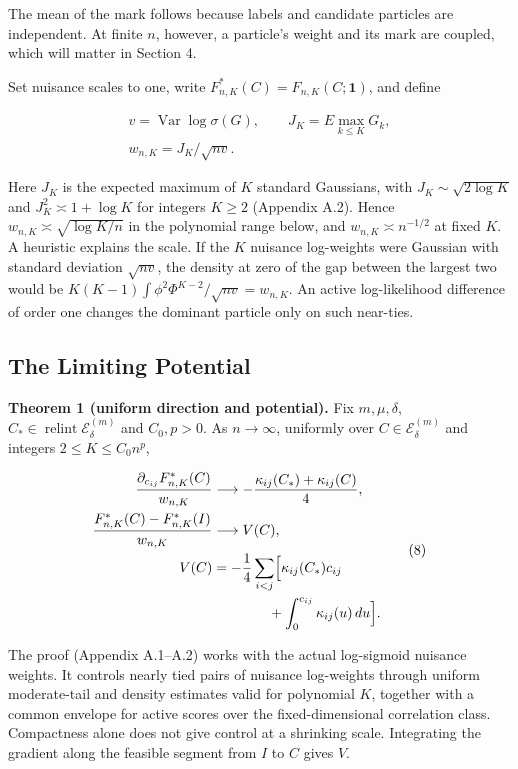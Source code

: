 \documentclass{article}
\begin{document}
The mean of the mark follows because labels and candidate particles are
independent. At finite \(n\), however, a particle's weight and its mark
are coupled, which will matter in Section 4.

Set nuisance scales to one, write \(F_{n,K}^*(C)=F_{n,K}(C;\mathbf1)\),
and define

\[
\begin{gathered}
v=\operatorname{Var}\log\sigma(G),\qquad J_K=E\max_{k\le K}G_k,\\
w_{n,K}=J_K/\sqrt{nv}.
\end{gathered}
\tag{7}
\]

Here \(J_K\) is the expected maximum of \(K\) standard Gaussians, with
\(J_K\sim\sqrt{2\log K}\) and \(J_K^2\asymp1+\log K\) for integers
\(K\ge2\) (Appendix A.2). Hence \(w_{n,K}\asymp\sqrt{\log K/n}\) in the
polynomial range below, and \(w_{n,K}\asymp n^{-1/2}\) at fixed \(K\). A
heuristic explains the scale. If the \(K\) nuisance log-weights were
Gaussian with standard deviation \(\sqrt{nv}\), the density at zero of
the gap between the largest two would be
\(K(K-1)\int\phi^2\Phi^{K-2}/\sqrt{nv}=w_{n,K}\). An active
log-likelihood difference of order one changes the dominant particle
only on such near-ties.

\subsection{The Limiting Potential}\label{the-limiting-potential}

\textbf{Theorem 1 (uniform direction and potential).} Fix
\(m,\mu,\delta\), \(C_*\in\operatorname{relint}\mathcal E_\delta^{(m)}\)
and \(C_0,p>0\). As \(n\to\infty\), uniformly over
\(C\in\mathcal E_\delta^{(m)}\) and integers \(2\le K\le C_0n^p\),

\[
\begin{aligned}
\frac{\partial_{c_{ij}}F_{n,K}^*(C)}{w_{n,K}}
&\longrightarrow-\frac{\kappa_{ij}(C_*)+\kappa_{ij}(C)}4,\\
\frac{F_{n,K}^*(C)-F_{n,K}^*(I)}{w_{n,K}}
&\longrightarrow V(C),\\
V(C)&=-\frac14\sum_{i<j}\Bigl[\kappa_{ij}(C_*)c_{ij}\\
&\qquad\qquad+\int_0^{c_{ij}}\kappa_{ij}(u)\,du\Bigr].
\end{aligned}
\tag{8}
\]

The proof (Appendix A.1--A.2) works with the actual log-sigmoid nuisance
weights. It controls nearly tied pairs of nuisance log-weights through
uniform moderate-tail and density estimates valid for polynomial \(K\),
together with a common envelope for active scores over the
fixed-dimensional correlation class. Compactness alone does not give
control at a shrinking scale. Integrating the gradient along the
feasible segment from \(I\) to \(C\) gives \(V\).
\end{document}

